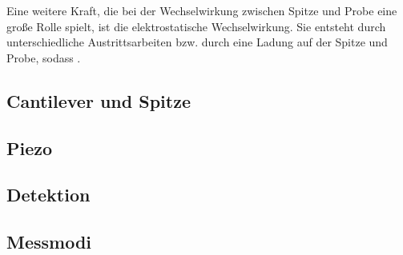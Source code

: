     Eine weitere Kraft, die bei der Wechselwirkung zwischen Spitze und Probe eine große Rolle spielt, ist die elektrostatische Wechselwirkung.
    Sie entsteht durch unterschiedliche Austrittsarbeiten bzw. durch eine Ladung auf der Spitze und Probe, sodass .


\subsection{Cantilever und Spitze}

\subsection{Piezo}

\subsection{Detektion}

\subsection{Messmodi}





